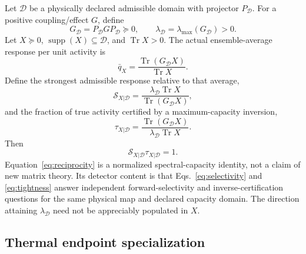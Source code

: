 \documentclass[aps,twocolumn,superscriptaddress,longbibliography]{revtex4-2}
\newcommand{\Tr}{\operatorname{Tr}}
\newcommand{\supp}{\operatorname{supp}}
\newcommand{\cD}{\mathcal D}
\newcommand{\cS}{\mathcal S}
\begin{document}
Let $\cD$ be a physically declared admissible domain with projector $P_{\cD}$. For a positive coupling/effect $G$, define
\begin{equation}
G_{\cD}=P_{\cD}GP_{\cD}\succeq0,
\qquad
\lambda_{\cD}=\lambda_{\max}(G_{\cD})>0.
\end{equation}
Let $X\succeq0$, $\supp(X)\subseteq\cD$, and $\Tr X>0$. The actual ensemble-average response per unit activity is
\begin{equation}
\bar q_X=\frac{\Tr(G_{\cD}X)}{\Tr X}.
\end{equation}
Define the strongest admissible response relative to that average,
\begin{equation}
\boxed{
\cS_{X|\cD}=\frac{\lambda_{\cD}\Tr X}{\Tr(G_{\cD}X)},}
\label{eq:selectivity}
\end{equation}
and the fraction of true activity certified by a maximum-capacity inversion,
\begin{equation}
\boxed{
\tau_{X|\cD}=\frac{\Tr(G_{\cD}X)}{\lambda_{\cD}\Tr X}.}
\label{eq:tightness}
\end{equation}
Then
\begin{equation}
\boxed{\cS_{X|\cD}\tau_{X|\cD}=1.}
\label{eq:reciprocity}
\end{equation}
Equation~\eqref{eq:reciprocity} is a normalized spectral-capacity identity, not a claim of new matrix theory. Its detector content is that Eqs.~\eqref{eq:selectivity} and \eqref{eq:tightness} answer independent forward-selectivity and inverse-certification questions for the same physical map and declared capacity domain. The direction attaining $\lambda_{\cD}$ need not be appreciably populated in $X$.

\subsection{Thermal endpoint specialization}
\end{document}
